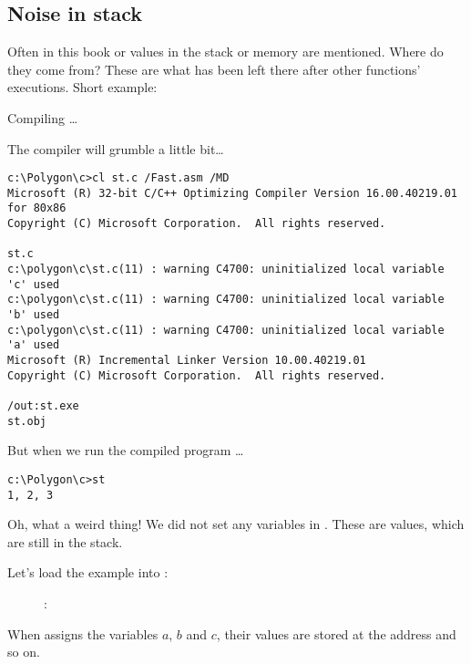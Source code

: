 \subsection{Noise in stack}

Often in this book  or  values in the stack or memory are mentioned.
Where do they come from?
These are what has been left there after other functions' executions.
Short example:



Compiling \dots



The compiler will grumble a little bit\dots

\begin{lstlisting}
c:\Polygon\c>cl st.c /Fast.asm /MD
Microsoft (R) 32-bit C/C++ Optimizing Compiler Version 16.00.40219.01 for 80x86
Copyright (C) Microsoft Corporation.  All rights reserved.

st.c
c:\polygon\c\st.c(11) : warning C4700: uninitialized local variable 'c' used
c:\polygon\c\st.c(11) : warning C4700: uninitialized local variable 'b' used
c:\polygon\c\st.c(11) : warning C4700: uninitialized local variable 'a' used
Microsoft (R) Incremental Linker Version 10.00.40219.01
Copyright (C) Microsoft Corporation.  All rights reserved.

/out:st.exe
st.obj
\end{lstlisting}

But when we run the compiled program \dots

\begin{lstlisting}
c:\Polygon\c>st
1, 2, 3
\end{lstlisting}

Oh, what a weird thing! We did not set any variables in . 
These are  values, which are still in the stack.

\clearpage
Let's load the example into \olly:

\begin{figure}[H]
\centering
{}
\caption{\olly: }
\label{fig:stack_noise_olly1}
\end{figure}

When  assigns the variables $a$, $b$ and $c$, their values are stored at the address  and so on.

